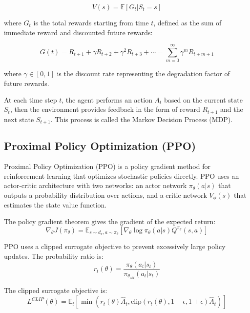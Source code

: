 \documentclass[conference]{IEEEtran}
\begin{document}
\begin{equation}
V(s) = \mathbb{E}[G_t | S_t = s]
\end{equation}

where $G_t$ is the total rewards starting from time $t$, defined as the sum of immediate reward and discounted future rewards:

\begin{equation}
G(t) = R_{t+1} + \gamma R_{t+2} + \gamma^2 R_{t+3} + \cdots = \sum_{m=0}^{\infty} \gamma^m R_{t+m+1}
\end{equation}

where $\gamma \in [0, 1]$ is the discount rate representing the degradation factor of future rewards.

At each time step $t$, the agent performs an action $A_t$ based on the current state $S_t$, then the environment provides feedback in the form of reward $R_{t+1}$ and the next state $S_{t+1}$. This process is called the Markov Decision Process (MDP).

\subsection{Proximal Policy Optimization (PPO)}

Proximal Policy Optimization (PPO) \cite{ppo} is a policy gradient method for reinforcement learning that optimizes stochastic policies directly. PPO uses an actor-critic architecture with two networks: an actor network $\pi_\theta(a|s)$ that outputs a probability distribution over actions, and a critic network $V_\phi(s)$ that estimates the state value function.

The policy gradient theorem gives the gradient of the expected return:
\begin{equation}
\nabla_\theta J(\pi_\theta) = \mathbb{E}_{s \sim d_\pi, a \sim \pi_\theta} \left[ \nabla_\theta \log \pi_\theta(a|s) Q^{\pi_\theta}(s, a) \right]
\end{equation}

PPO uses a clipped surrogate objective to prevent excessively large policy updates. The probability ratio is:
\begin{equation}
r_t(\theta) = \frac{\pi_\theta(a_t|s_t)}{\pi_{\theta_{old}}(a_t|s_t)}
\end{equation}

The clipped surrogate objective is:
\begin{equation}
L^{CLIP}(\theta) = \mathbb{E}_t \left[ \min\left( r_t(\theta) \hat{A}_t, \text{clip}(r_t(\theta), 1-\epsilon, 1+\epsilon) \hat{A}_t \right) \right]
\end{equation}
\end{document}
